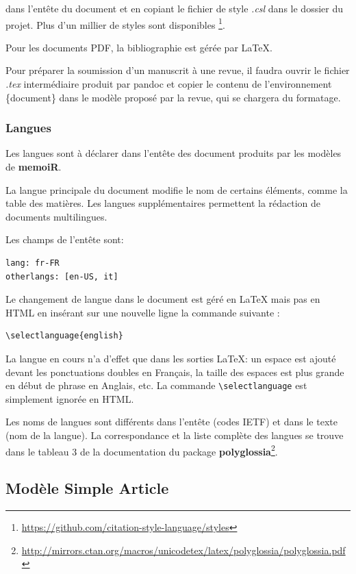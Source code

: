 \documentclass[
  12pt,
  french,
  a4paper,
  extrafontsizes,onecolumn,openright
  ]{memoir}
\begin{document}
dans l'entête du document et en copiant le fichier de style \emph{.csl} dans le dossier du projet.
Plus d'un millier de styles sont disponibles \footnote{\url{https://github.com/citation-style-language/styles}}.

Pour les documents PDF, la bibliographie est gérée par LaTeX.

Pour préparer la soumission d'un manuscrit à une revue, il faudra ouvrir le fichier \emph{.tex} intermédiaire produit par pandoc et copier le contenu de l'environnement \{document\} dans le modèle proposé par la revue, qui se chargera du formatage.

\hypertarget{langues}{%
\subsubsection{Langues}\label{langues}}

Les langues sont à déclarer dans l'entête des document produits par les modèles de \textbf{memoiR}.

La langue principale du document modifie le nom de certains éléments, comme la table des matières.
Les langues supplémentaires permettent la rédaction de documents multilingues.

Les champs de l'entête sont:

\begin{verbatim}
lang: fr-FR
otherlangs: [en-US, it]
\end{verbatim}

Le changement de langue dans le document est géré en LaTeX mais pas en HTML en insérant sur une nouvelle ligne la commande suivante :

\begin{verbatim}
\selectlanguage{english}
\end{verbatim}

La langue en cours n'a d'effet que dans les sorties LaTeX: un espace est ajouté devant les ponctuations doubles en Français, la taille des espaces est plus grande en début de phrase en Anglais, etc.
La commande \texttt{\textbackslash{}selectlanguage} est simplement ignorée en HTML.

Les noms de langues sont différents dans l'entête (codes IETF) et dans le texte (nom de la langue).
La correspondance et la liste complète des langues se trouve dans le tableau 3 de la documentation du package \textbf{polyglossia}\footnote{\url{http://mirrors.ctan.org/macros/unicodetex/latex/polyglossia/polyglossia.pdf}}.

\hypertarget{sec:memo}{%
\subsection{Modèle Simple Article}\label{sec:memo}}
\end{document}

